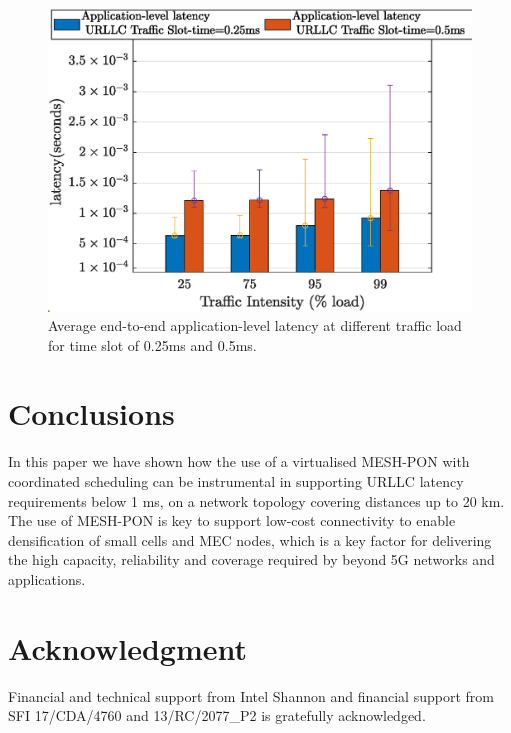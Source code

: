 \documentclass[a4paper, oneside, twocolumn, notitlepage, 10pt]{extarticle_ecoc}
\begin{document}
\begin{figure}[h]
	\centering
	\vspace{-4mm}
	\includegraphics[clip, trim={0 0 0 0}, width=\linewidth]{./Figures/tow-tiervPON_diffSolt.eps}
	\caption{Average end-to-end application-level latency at different traffic load for time slot of 0.25ms and 0.5ms.}
	\label{Fig:tow-tiervPON_diffSolt}
\end{figure}


\vspace{-2mm}
\section{Conclusions} \label{sec:Conclusion}
In this paper we have shown how the use of a virtualised MESH-PON with coordinated scheduling can be instrumental in supporting URLLC latency requirements below 1 ms, on a network topology covering distances up to 20 km. The use of MESH-PON is key to support low-cost connectivity to enable densification of small cells and MEC nodes, which is a key factor for delivering the high capacity, reliability and coverage required by beyond 5G networks and applications.

\vspace{-2mm}
\section*{Acknowledgment} \label{sec:Acknowledgment}
	Financial and technical support from Intel Shannon and financial support from SFI 17/CDA/4760 and 13/RC/2077\_P2 is gratefully acknowledged.
\end{document}
